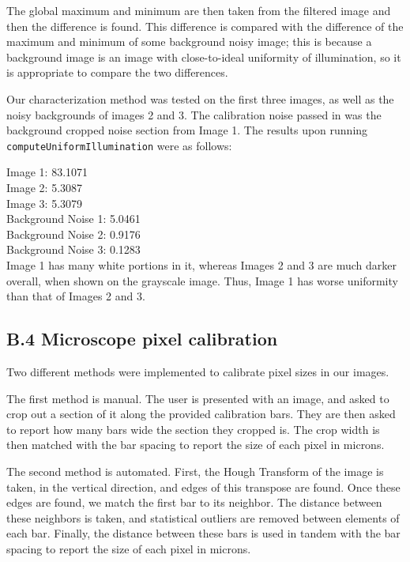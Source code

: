 \documentclass{article}
\begin{document}
The global maximum and minimum are then taken from the filtered image and then the difference is found.  This difference is compared with the difference of the maximum and minimum of some background noisy image; this is because a background image is an image with close-to-ideal uniformity of illumination, so it is appropriate to compare the two differences.

Our characterization method was tested on the first three images, as well as the noisy backgrounds of images 2 and 3. The calibration noise passed in was the background cropped noise section from Image 1. The results upon running \texttt{computeUniformIllumination} were as follows:

Image 1: 83.1071\\
Image 2: 5.3087\\
Image 3: 5.3079\\
Background Noise 1: 5.0461\\
Background Noise 2: 0.9176\\
Background Noise 3: 0.1283\\

Image 1 has many white portions in it, whereas Images 2 and 3 are much darker overall, when shown on the grayscale image. Thus, Image 1 has worse uniformity than that of Images 2 and 3.\\

\pagebreak
\subsection*{B.4 Microscope pixel calibration}
 
Two different methods were implemented to calibrate pixel sizes in our images.

The first method is manual. The user is presented with an image, and asked to crop out a section of it along the provided calibration bars. They are then asked to report how many bars wide the section they cropped is. The crop width is then matched with the bar spacing to report the size of each pixel in microns.

The second method is automated. First, the Hough Transform of the image is taken, in the vertical direction, and edges of this transpose are found. Once these edges are found, we match the first bar to its neighbor. The distance between these neighbors is taken, and statistical outliers are removed between elements of each bar. Finally, the distance between these bars is used in tandem with the bar spacing to report the size of each pixel in microns.
\end{document}
